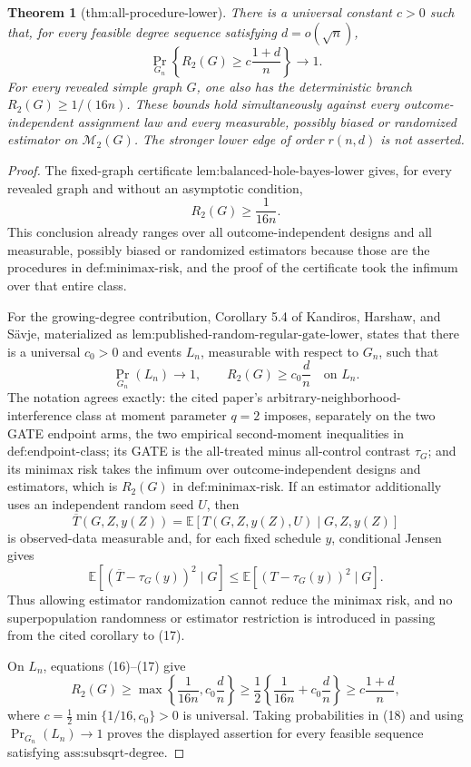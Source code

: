\documentclass{article}
\newtheorem{theorem}{Theorem}
\begin{document}
\begin{theorem}[thm:all-procedure-lower]\label{thm:all-procedure-lower}
There is a universal constant \(c>0\) such that, for every feasible degree sequence satisfying \(d=o(\sqrt n)\), \[\Pr_{G_n}\!\left\{R_2(G)\ge c\frac{1+d}{n}\right\}\longrightarrow1.\] For every revealed simple graph \(G\), one also has the deterministic branch \(R_2(G)\ge1/(16n)\). These bounds hold simultaneously against every outcome-independent assignment law and every measurable, possibly biased or randomized estimator on \(\mathcal M_2(G)\). The stronger lower edge of order \(r(n,d)\) is not asserted.
\end{theorem}
\begin{proof}
The fixed-graph certificate \(\text{lem:balanced-hole-bayes-lower}\) gives, for every revealed graph and without an asymptotic condition,
\[
R_2(G)\ge\frac1{16n}. \tag{16}
\]
This conclusion already ranges over all outcome-independent designs and all measurable, possibly biased or randomized estimators because those are the procedures in \(\text{def:minimax-risk}\), and the proof of the certificate took the infimum over that entire class.

For the growing-degree contribution, Corollary 5.4 of Kandiros, Harshaw, and S\"avje, materialized as \(\text{lem:published-random-regular-gate-lower}\), states that there is a universal \(c_0>0\) and events \(L_n\), measurable with respect to \(G_n\), such that
\[
\Pr_{G_n}(L_n)\longrightarrow1,
\qquad
R_2(G)\ge c_0\frac d n\quad\text{on }L_n. \tag{17}
\]
The notation agrees exactly: the cited paper's arbitrary-neighborhood-interference class at moment parameter \(q=2\) imposes, separately on the two GATE endpoint arms, the two empirical second-moment inequalities in \(\text{def:endpoint-class}\); its GATE is the all-treated minus all-control contrast \(\tau_G\); and its minimax risk takes the infimum over outcome-independent designs and estimators, which is \(R_2(G)\) in \(\text{def:minimax-risk}\).  If an estimator additionally uses an independent random seed \(U\), then
\[
\overline T(G,Z,y(Z))
=\mathbb E[T(G,Z,y(Z),U)\mid G,Z,y(Z)]
\]
is observed-data measurable and, for each fixed schedule \(y\), conditional Jensen gives
\[
\mathbb E[(\overline T-\tau_G(y))^2\mid G]
\le
\mathbb E[(T-\tau_G(y))^2\mid G].
\]
Thus allowing estimator randomization cannot reduce the minimax risk, and no superpopulation randomness or estimator restriction is introduced in passing from the cited corollary to (17).

On \(L_n\), equations (16)--(17) give
\[
R_2(G)\ge
\max\!\left\{\frac1{16n},c_0\frac d n\right\}
\ge \frac12\left\{\frac1{16n}+c_0\frac d n\right\}
\ge c\frac{1+d}{n}, \tag{18}
\]
where \(c=\tfrac12\min\{1/16,c_0\}>0\) is universal.  Taking probabilities in (18) and using \(\Pr_{G_n}(L_n)\to1\) proves the displayed assertion for every feasible sequence satisfying \(\text{ass:subsqrt-degree}\).


\end{proof}
\end{document}

